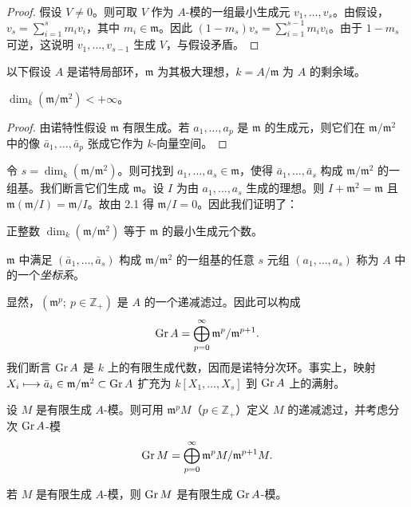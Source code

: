 \begin{proof}
假设 $V\neq 0$。则可取 $V$ 作为 $A$-模的一组最小生成元 $v_1,\dots,v_s$。由假设，$v_s=\sum_{i=1}^s m_i v_i$，其中 $m_i\in\mathfrak{m}$。因此 $(1-m_s)v_s=\sum_{i=1}^{s-1}m_i v_i$。由于 $1-m_s$ 可逆，这说明 $v_1,\dots,v_{s-1}$ 生成 $V$，与假设矛盾。
\end{proof}

以下假设 $A$ 是诺特局部环，$\mathfrak{m}$ 为其极大理想，$k=A/\mathfrak{m}$ 为 $A$ 的剩余域。

\begin{lemma}
$\dim_k(\mathfrak{m}/\mathfrak{m}^2)<+\infty$。
\end{lemma}

\begin{proof}
由诺特性假设 $\mathfrak{m}$ 有限生成。若 $a_1,\dots,a_p$ 是 $\mathfrak{m}$ 的生成元，则它们在 $\mathfrak{m}/\mathfrak{m}^2$ 中的像 $\bar a_1,\dots,\bar a_p$ 张成它作为 $k$-向量空间。
\end{proof}

令 $s=\dim_k(\mathfrak{m}/\mathfrak{m}^2)$。则可找到 $a_1,\dots,a_s\in\mathfrak{m}$，使得 $\bar a_1,\dots,\bar a_s$ 构成 $\mathfrak{m}/\mathfrak{m}^2$ 的一组基。我们断言它们生成 $\mathfrak{m}$。设 $I$ 为由 $a_1,\dots,a_s$ 生成的理想。则 $I+\mathfrak{m}^2=\mathfrak{m}$ 且 $\mathfrak{m}(\mathfrak{m}/I)=\mathfrak{m}/I$。故由 2.1 得 $\mathfrak{m}/I=0$。因此我们证明了：

\begin{lemma}
正整数 $\dim_k(\mathfrak{m}/\mathfrak{m}^2)$ 等于 $\mathfrak{m}$ 的最小生成元个数。
\end{lemma}

$\mathfrak{m}$ 中满足 $(\bar a_1,\dots,\bar a_s)$ 构成 $\mathfrak{m}/\mathfrak{m}^2$ 的一组基的任意 $s$ 元组 $(a_1,\dots,a_s)$ 称为 $A$ 中的一个\emph{坐标系}。

显然，$(\mathfrak{m}^p;\ p\in\mathbb{Z}_+)$ 是 $A$ 的一个递减滤过。因此可以构成
$$\operatorname{Gr} A=\bigoplus_{p=0}^{\infty}\mathfrak{m}^p/\mathfrak{m}^{p+1}.$$
我们断言 $\operatorname{Gr} A$ 是 $k$ 上的有限生成代数，因而是诺特分次环。事实上，映射 $X_i\longmapsto \bar a_i\in\mathfrak{m}/\mathfrak{m}^2\subset\operatorname{Gr} A$ 扩充为 $k[X_1,\dots,X_s]$ 到 $\operatorname{Gr} A$ 上的满射。

设 $M$ 是有限生成 $A$-模。则可用 $\mathfrak{m}^p M$（$p\in\mathbb{Z}_+$）定义 $M$ 的递减滤过，并考虑分次 $\operatorname{Gr} A$-模
$$\operatorname{Gr} M=\bigoplus_{p=0}^{\infty}\mathfrak{m}^p M/\mathfrak{m}^{p+1}M.$$

\begin{lemma}
若 $M$ 是有限生成 $A$-模，则 $\operatorname{Gr} M$ 是有限生成 $\operatorname{Gr} A$-模。
\end{lemma}

